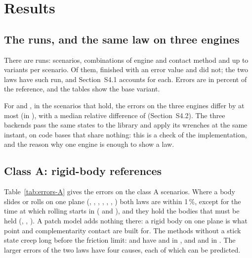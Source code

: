 \section{Results}\label{sec:results}


\subsection{The runs, and the same law on three engines}\label{sec:runs}\label{sec:independence}

There are  runs:  scenarios,
 combinations of engine and contact method and up to
 variants per scenario. Of them,  finished with an
error value and  did not; the two laws have 
such run, and Section~S4.1 accounts for each. Errors are in percent of the reference, and the
tables show the base variant.

For  and , in the  scenarios that
hold, the errors on the three engines differ by at most  (in
), with a median relative difference of
 (Section~S4.2). The three backends pass the same states to the
library and apply its wrenches at the same instant, on code bases that share nothing: this is a
check of the implementation, and the reason why one engine is enough to show a law.

\subsection{Class A: rigid-body references}\label{sec:classA}

Table~\ref{tab:errors-A} gives the errors on the  class A scenarios. Where a
body slides or rolls on one plane (, , , ,
, , ) both laws are within 1\,\%, except for the time at which rolling starts in 
( and ), and they hold the
bodies that must be held (, , ). A patch model adds nothing
there: a rigid body on one plane is what point and complementarity contact are built for. The methods without a stick state creep long before
the friction limit:  and  have  and
 in , and  and 
in . The larger errors of the two laws have four causes, each of which can be
predicted.

